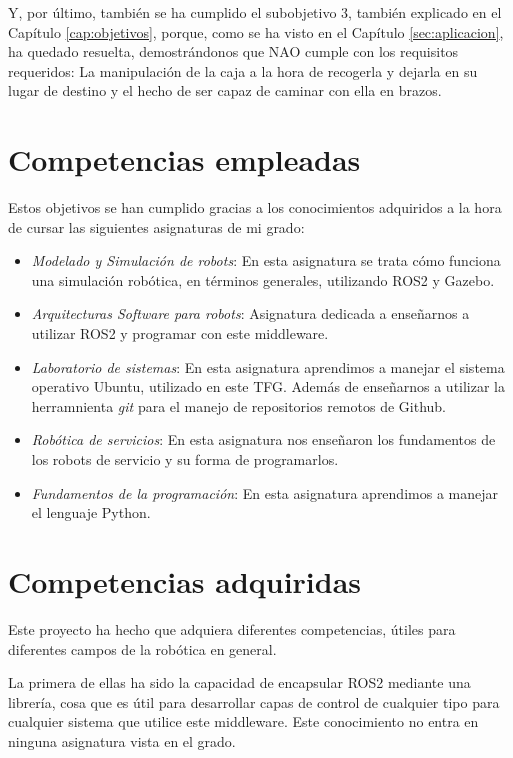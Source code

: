 Y, por último, también se ha cumplido el subobjetivo 3, también explicado en el Capítulo \ref{cap:objetivos}, porque, como se ha visto en el Capítulo \ref{sec:aplicacion}, ha quedado resuelta, demostrándonos que NAO cumple con los requisitos requeridos: La manipulación de la caja a la hora de recogerla y dejarla en su lugar de destino y el hecho de ser capaz de caminar con ella en brazos.

\section{Competencias empleadas}

Estos objetivos se han cumplido gracias a los conocimientos adquiridos a la hora de cursar las siguientes asignaturas de mi grado:

\begin{itemize}
    \item \textit{Modelado y Simulación de robots}: En esta asignatura se trata cómo funciona una simulación robótica, en términos generales, utilizando ROS2 y Gazebo.
    \item \textit{Arquitecturas Software para robots}: Asignatura dedicada a enseñarnos a utilizar ROS2 y programar con este middleware.

    \item \textit{Laboratorio de sistemas}: En esta asignatura aprendimos a manejar el sistema operativo Ubuntu,  utilizado en este TFG. Además de enseñarnos a utilizar la herramnienta \textit{git} para el manejo de repositorios remotos de Github.

    \item \textit{Robótica de servicios}: En esta asignatura nos enseñaron los fundamentos de los robots de servicio y su forma de programarlos.

    \item \textit{Fundamentos de la programación}: En esta asignatura aprendimos a manejar el lenguaje Python. 
    
\end{itemize}

\section{Competencias adquiridas}

Este proyecto ha hecho que adquiera diferentes competencias, útiles para diferentes campos de la robótica en general.

La primera de ellas ha sido la capacidad de encapsular ROS2 mediante una librería, cosa que es útil para desarrollar capas de control de cualquier tipo para cualquier sistema que utilice este middleware. Este conocimiento no entra en ninguna asignatura vista en el grado.

